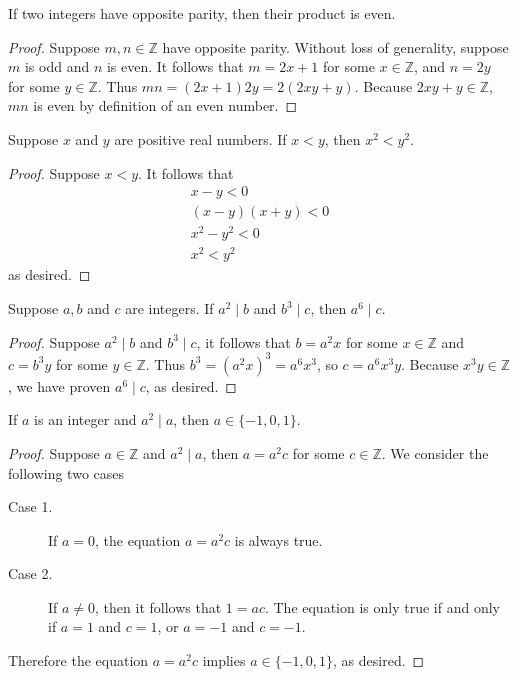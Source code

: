 \documentclass{exam}
\begin{document}
\begin{proposition}{4.17}
    If two integers have opposite parity, then their product is even.
\end{proposition}

\begin{proof}
    Suppose $m, n \in \mathbb Z$ have opposite parity. Without loss of generality, suppose $m$ is odd and $n$ is even. It follows that $m = 2x + 1$ for some $x \in\mathbb Z$, and $n = 2y$ for some $y \in\mathbb Z$. Thus $mn = (2x+1)2y = 2(2xy+y)$. Because $2xy + y\in\mathbb Z$, $mn$ is even by definition of an even number.
\end{proof}

\begin{proposition}{4.18}
    Suppose $x$ and $y$ are positive real numbers. If $x < y$, then $x^2 < y^2$.
\end{proposition}

\begin{proof}
    Suppose $x < y$. It follows that
    \begin{align*}
        x-y < 0       \\
        (x-y)(x+y)<0  \\
        x^2 - y^2 < 0 \\
        x^2 < y^2
    \end{align*}
    as desired.
\end{proof}

\begin{proposition}{4.19}
    Suppose $a, b$ and $c$ are integers. If $a^2\mid b$ and $b^3\mid c$, then $a^6 \mid c$.
\end{proposition}

\begin{proof}
    Suppose $a^2 \mid b$ and $b^3 \mid c$, it follows that $b = a^2x$ for some $x\in\mathbb Z$ and $c = b^3y$ for some $y\in\mathbb Z$. Thus $b^3 = (a^2x)^3=a^6x^3$, so $c = a^6x^3y$. Because $x^3y \in\mathbb Z$, we have proven $a^6 \mid c$, as desired.
\end{proof}

\begin{proposition}{4.20}
    If $a$ is an integer and $a^2 \mid a$, then $a \in \{-1, 0, 1\}$.
\end{proposition}

\begin{proof}
    Suppose $a\in\mathbb Z$ and $a^2 \mid a$, then $a = a^2c$ for some $c \in\mathbb Z$. We consider the following two cases
    \begin{description}
        \item[Case 1. ] If $a = 0$, the equation $a = a^2c$ is always true.
        \item[Case 2. ] If $a \neq 0$, then it follows that $1 = ac$. The equation is only true if and only if $a = 1$ and $c = 1$, or $a = -1$ and $c = -1$.
    \end{description}

    Therefore the equation $a=a^2c$ implies $a\in\{-1, 0, 1\}$, as desired.
\end{proof}
\end{document}
